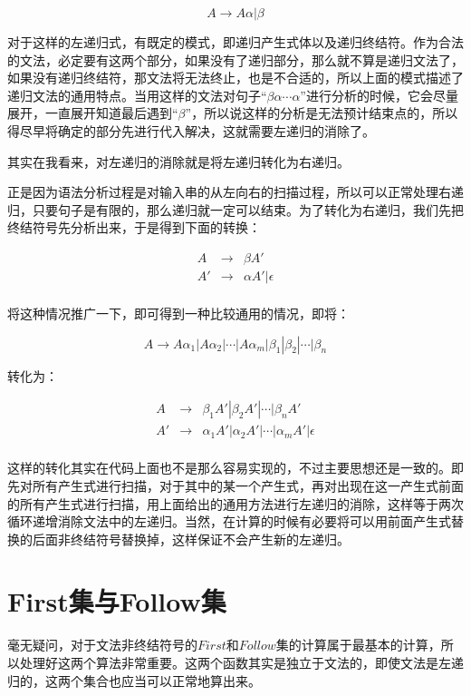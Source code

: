 $$
    A \rightarrow A \alpha | \beta
$$

对于这样的左递归式，有既定的模式，即递归产生式体以及递归终结符。作为合法的文法，必定要有这两个部分，如果没有了递归部分，那么就不算是递归文法了，如果没有递归终结符，那文法将无法终止，也是不合适的，所以上面的模式描述了递归文法的通用特点。当用这样的文法对句子“$\beta \alpha \cdots \alpha$”进行分析的时候，它会尽量展开，一直展开知道最后遇到“$\beta$”，所以说这样的分析是无法预计结束点的，所以得尽早将确定的部分先进行代入解决，这就需要左递归的消除了。\begin{bfseries}其实在我看来，对左递归的消除就是将左递归转化为右递归。\end{bfseries}正是因为语法分析过程是对输入串的从左向右的扫描过程，所以可以正常处理右递归，只要句子是有限的，那么递归就一定可以结束。为了转化为右递归，我们先把终结符号先分析出来，于是得到下面的转换：

\begin{eqnarray*}
    A  & \rightarrow & \beta A' \\
    A' & \rightarrow & \alpha A' | \epsilon \\
\end{eqnarray*}

将这种情况推广一下，即可得到一种比较通用的情况，即将：

$$
    A \rightarrow A \alpha_1 | A \alpha_2 | \cdots | A \alpha_m 
                  | \beta_1  | \beta_2    | \cdots | \beta_n
$$

转化为：

\begin{eqnarray*}
    A  & \rightarrow & \beta_1 A'| \beta_2 A' | \cdots | \beta_n A' \\
    A' & \rightarrow & \alpha_1 A' | \alpha_2 A' | \cdots | \alpha_m A' | \epsilon \\
\end{eqnarray*}

这样的转化其实在代码上面也不是那么容易实现的，不过主要思想还是一致的。即先对所有产生式进行扫描，对于其中的某一个产生式，再对出现在这一产生式前面的所有产生式进行扫描，用上面给出的通用方法进行左递归的消除，这样等于两次循环递增消除文法中的左递归。当然，在计算的时候有必要将可以用前面产生式替换的后面非终结符号替换掉，这样保证不会产生新的左递归。

\section{First集与Follow集}

毫无疑问，对于文法非终结符号的$First$和$Follow$集的计算属于最基本的计算，所以处理好这两个算法非常重要。这两个函数其实是独立于文法的，即使文法是左递归的，这两个集合也应当可以正常地算出来。

